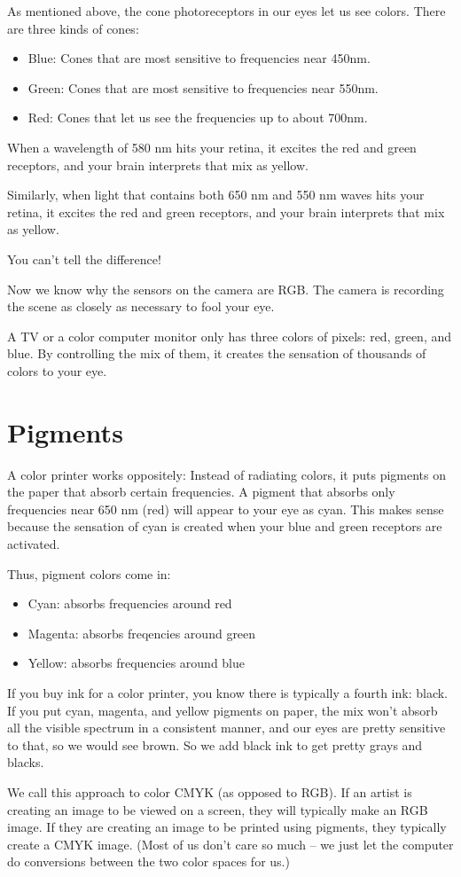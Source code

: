 As mentioned above, the cone photoreceptors in our eyes let us see
colors. There are three kinds of cones:
\begin{itemize}
  \item Blue: Cones that are most sensitive to frequencies near 450nm.
  \item Green: Cones that are most sensitive to frequencies near 550nm.
  \item Red: Cones that let us see the frequencies up to about 700nm.
\end{itemize}

When a wavelength of 580 nm hits your retina, it excites the red
and green receptors, and your brain interprets that mix as yellow.

Similarly, when light that contains both 650 nm and 550 nm waves hits
your retina, it excites the red and green receptors, and your brain
interprets that mix as yellow.

You can't tell the difference!

Now we know why the sensors on the camera are RGB. The camera is
recording the scene as closely as necessary to fool your eye.

A TV or a color computer monitor only has three colors of pixels: red,
green, and blue.  By controlling the mix of them, it creates the
sensation of thousands of colors to your eye.

\section{Pigments}

A color printer works oppositely: Instead of radiating
colors, it puts pigments on the paper that absorb certain frequencies.
A pigment that absorbs only frequencies near 650 nm (red) will appear
to your eye as cyan. This makes sense because the sensation of cyan is
created when your blue and green receptors are activated.

Thus, pigment colors come in:
\begin{itemize}
\item Cyan: absorbs frequencies around red
\item Magenta: absorbs freqencies around green
\item Yellow: absorbs frequencies around blue
\end{itemize}

If you buy ink for a color printer, you know there is typically a
fourth ink: black. If you put cyan, magenta, and yellow pigments on
paper, the mix won't absorb all the visible spectrum in a consistent
manner, and our eyes are pretty sensitive to that, so we would see
brown. So we add black ink to get pretty grays and blacks.

We call this approach to color CMYK (as opposed to RGB). If an artist
is creating an image to be viewed on a screen, they will typically
make an RGB image.  If they are creating an image to be printed using
pigments, they typically create a CMYK image. (Most of us don't care
so much -- we just let the computer do conversions between the two
color spaces for us.)

